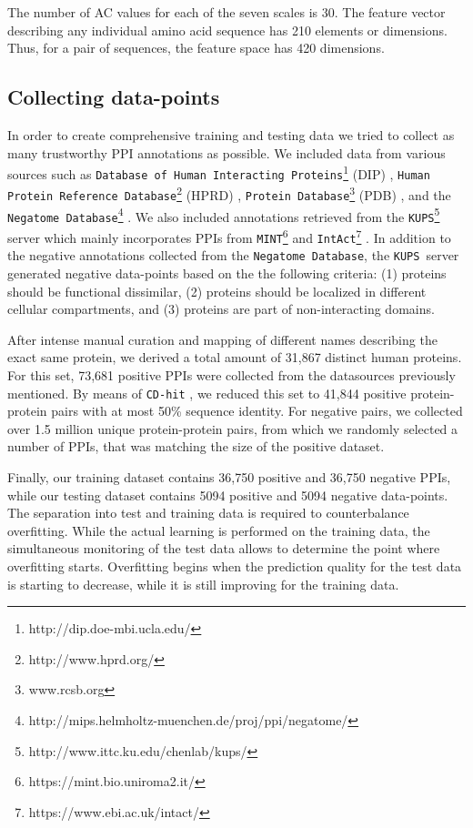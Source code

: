 \documentclass{bioinfo}
\newcommand{\nega}{\texttt{Negatome Database}}
\newcommand{\kups}{\texttt{KUPS}}
\begin{document}
The number of AC values for each of the seven scales is 30. 
The feature vector describing any individual amino acid sequence has 210 elements or dimensions.
Thus, for a pair of sequences, the feature space has 420 dimensions. 


\subsection{Collecting data-points}
In order to create comprehensive training and testing data we tried to
collect as many trustworthy PPI annotations as possible. We included
data from various sources such as \texttt{Database of Human
  Interacting Proteins}\footnote{http://dip.doe-mbi.ucla.edu/} (DIP)
\citep{Salwinski:2004}, \texttt{Human Protein Reference
  Database}\footnote{http://www.hprd.org/} (HPRD)
\citep{Keshava_Prasad:2009}, \texttt{Protein
  Database}\footnote{www.rcsb.org} (PDB) \citep{Berman:2000}, and the
\nega\footnote{http://mips.helmholtz-muenchen.de/proj/ppi/negatome/}
\citep{Blohm:2014}. We also included annotations retrieved from the
\kups \footnote{http://www.ittc.ku.edu/chenlab/kups/}   server
\citep{Chen:2011} which mainly incorporates PPIs from
\texttt{MINT}\footnote{https://mint.bio.uniroma2.it/}
\citep{Licata:2012} and
\texttt{IntAct}\footnote{https://www.ebi.ac.uk/intact/}
\citep{Orchard:2014}. In addition to the negative annotations collected
from the \nega, the \kups\ server generated negative data-points based
on the the following criteria: (1) proteins should be functional
dissimilar, (2) proteins should be localized in different cellular
compartments, and (3) proteins are part of non-interacting domains. 

After intense manual curation and mapping of different names describing
the exact same protein, we derived a total amount of 31,867 distinct
human proteins. For this set, 73,681 positive PPIs were collected
from the datasources previously mentioned. By means of \texttt{CD-hit}
\citep{Li:2006, Fu:2012}, we reduced this set to 41,844 positive
protein-protein pairs with at most 50\% sequence identity. For
negative pairs, we collected over 1.5 million unique protein-protein
pairs, from which we randomly selected a number of PPIs, that was
matching the size of the positive dataset.

Finally, our training dataset contains 36,750 positive and 36,750
negative PPIs, while our testing dataset contains 5094 positive and
5094 negative data-points.
The separation into test and training data is required to counterbalance overfitting.
While the actual learning is performed on the training data,
the simultaneous monitoring of the test data allows to determine the point where overfitting starts.
Overfitting begins when the prediction quality for the test data is starting to decrease,
while it is still improving for the training data.
\end{document}

